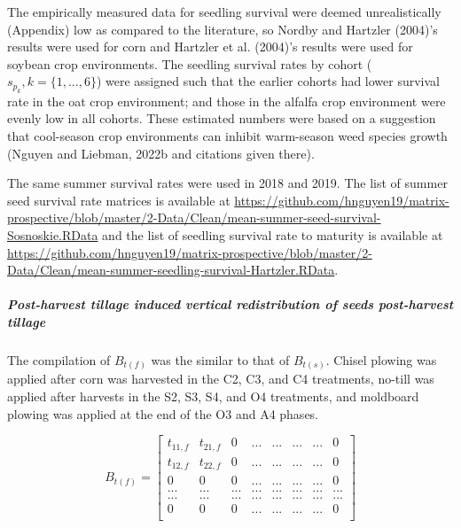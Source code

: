 \documentclass[
]{article}
\begin{document}
The empirically measured data for seedling survival were deemed unrealistically (Appendix) low as compared to the literature, so Nordby and Hartzler (2004)'s results were used for corn and Hartzler et al. (2004)'s results were used for soybean crop environments. The seedling survival rates by cohort (\(s_{p_k}, k = \{1,...,6\}\)) were assigned such that the earlier cohorts had lower survival rate in the oat crop environment; and those in the alfalfa crop environment were evenly low in all cohorts. These estimated numbers were based on a suggestion that cool-season crop environments can inhibit warm-season weed species growth (Nguyen and Liebman, 2022b and citations given there).

The same summer survival rates were used in 2018 and 2019. The list of summer seed survival rate matrices is available at \url{https://github.com/hnguyen19/matrix-prospective/blob/master/2-Data/Clean/mean-summer-seed-survival-Sosnoskie.RData} and the list of seedling survival rate to maturity is available at \url{https://github.com/hnguyen19/matrix-prospective/blob/master/2-Data/Clean/mean-summer-seedling-survival-Hartzler.RData}.

\hypertarget{post-harvest-tillage-induced-vertical-redistribution-of-seeds-post-harvest-tillage}{%
\subparagraph*{Post-harvest tillage induced vertical redistribution of seeds post-harvest tillage}\label{post-harvest-tillage-induced-vertical-redistribution-of-seeds-post-harvest-tillage}}

The compilation of \(B_{t(f)}\) was the similar to that of \(B_{t(s)}\). Chisel plowing was applied after corn was harvested in the C2, C3, and C4 treatments, no-till was applied after harvests in the S2, S3, S4, and O4 treatments, and moldboard plowing was applied at the end of the O3 and A4 phases.

\[
B_{t(f)} = \left[\begin{array}
{rr|rrrrr} 
t_{11,f} & t_{21,f} & 0 & ... & ... & ... & ... & 0\\
t_{12,f} & t_{22,f} & 0 & ... & ... & ... & ... & 0\\
\hline    
0 & 0 & 0 & ... & ... & ... & ... & 0\\
... & ... & ... & ... & ... & ... & ... & ...\\ 
... & ... & ... & ... & ... & ... & ... & ...\\ 
0 & 0 & 0 & ... & ... & ... & ... & 0\\
\end{array}\right]
\]
\end{document}
